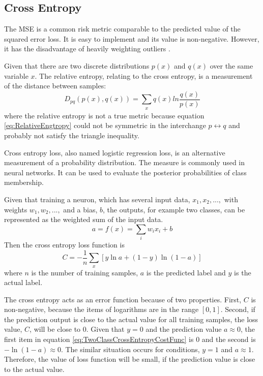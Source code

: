 \subsection{Cross Entropy}

The MSE is a common risk metric comparable to the predicted value of the squared error loss. It is easy to implement and its value is non-negative. However, it has the disadvantage of heavily weighting outliers \citep{bermejo2001oriented}.

Given that there are two discrete distributions $p(x)$ and $q(x)$ over the same variable $x$. The relative entropy, relating to the cross entropy, is a measurement of the distance between samples:
\begin{equation}\label{eq:RelativeEngtropy}
D_{pq}(p(x), q(x)) = \sum_{\substack{x}}q(x)ln\frac{q(x)}{p(x)}
\end{equation}
where the relative entropy is not a true metric because equation \ref{eq:RelativeEngtropy} could not be symmetric in the interchange $p \leftrightarrow q$ and probably not satisfy the triangle inequality.

Cross entropy loss, also named logistic regression loss, is an alternative measurement of a probability distribution. The measure is commonly used in neural networks. It can be used to evaluate the posterior probabilities of class membership.

Given that training a neuron, which has several input data, $x_{1}, x_{2},...,$ with weights $w_{1}, w_{2},...,$ and a bias, $b$, the outputs, for example two classes, can be represented as the weighted sum of the input data.
\begin{equation}\label{eq:EquationNN}
a = f(x) = \sum_{i}w_{i}x_{i} + b
\end{equation}
Then the cross entropy loss function is
\begin{equation}\label{eq:TwoClassCrossEntropyCostFunc}
C = -\frac{1}{n} \sum_x \left[y \ln a + (1-y ) \ln (1-a) \right]
\end{equation}
where $n$ is the number of training samples, $a$ is the predicted label and $y$ is the actual label.

The cross entropy acts as an error function because of two properties. First, $C$ is non-negative, because the items of logarithms are in the range $[0,1]$. Second, if the prediction output is close to the actual value for all training samples, the loss value, $C$, will be close to $0$. Given that $y = 0$ and the prediction value $a \approx 0$, the first item in equation \ref{eq:TwoClassCrossEntropyCostFunc} is $0$ and the second is $-\ln(1-a) \approx 0$. The similar situation occurs for conditions, $y = 1$ and $a \approx 1$. Therefore, the value of loss function will be small, if the prediction value is close to the actual value.

